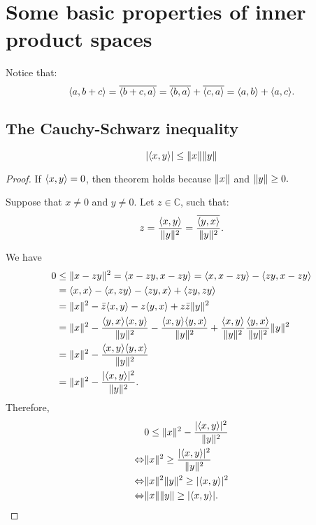 \section{Some basic properties of inner product spaces}\label{sec:part2}
Notice that:
\[\langle a, b+c \rangle  = \overline{\langle b+c, a \rangle} = \overline{\langle b, a \rangle} + \overline{\langle c, a \rangle} = \langle a, b \rangle + \langle a, c \rangle.\]

\subsection{The Cauchy-Schwarz inequality}
\[\lvert \langle x, y \rangle \rvert \leq \lVert x \rVert \lVert y \rVert\]
\begin{proof}
	If $\langle x, y \rangle = 0$, then theorem holds because $\lVert x \rVert$ and $\lVert y \rVert \geq 0.$
	
	Suppose that $x \neq 0$ and $y \neq 0$. Let $z \in \mathbb{C}$, such that:
	\[z = \frac{\langle x, y \rangle}{\lVert y \rVert^2} = \frac{\overline{\langle y, x \rangle}}{\lVert y \rVert^2}.\]
	
	We have
	\begin{align*}
		0 &\leq \lVert x - zy \rVert^2 = \langle x-zy, x-zy \rangle = \langle x, x-zy \rangle - \langle zy, x-zy \rangle \\
		&= \langle x, x \rangle - \langle x, zy \rangle - \langle zy, x \rangle + \langle zy, zy \rangle \\
		&= \lVert x \rVert^2 -\bar{z}\langle x, y \rangle - z\langle y, x \rangle + z \bar{z} \lVert y \rVert^2 \\
		&= \lVert x \rVert^2 - \frac{\langle y, x \rangle\langle x, y \rangle}{\lVert y \rVert^2} - \frac{\langle x, y \rangle\langle y, x \rangle}{\lVert y \rVert^2} + \frac{\langle x, y \rangle}{\lVert y \rVert^2} \frac{\langle y, x \rangle}{\lVert y \rVert^2} \lVert y \rVert^2 \\
		&= \lVert x \rVert^2 - \frac{\langle x, y \rangle\langle y, x \rangle}{\lVert y \rVert^2} \\
		&= \lVert x \rVert^2 - \frac{\lvert \langle x, y \rangle \rvert^2}{\lVert y \rVert^2}.
	\end{align*}
	Therefore,
	\begin{align*}
		&0 \leq \lVert x \rVert^2 - \frac{\lvert \langle x, y \rangle \rvert^2}{\lVert y \rVert^2} \\
		\Leftrightarrow & \lVert x \rVert^2 \geq \frac{\lvert \langle x, y \rangle \rvert^2}{\lVert y \rVert^2} \\
		\Leftrightarrow & \lVert x \rVert^2 \lVert y \rVert^2 \geq \lvert \langle x, y \rangle \rvert^2 \\
		\Leftrightarrow & \lVert x \rVert \lVert y \rVert \geq \lvert \langle x, y \rangle \rvert.
	\end{align*}
\end{proof}

